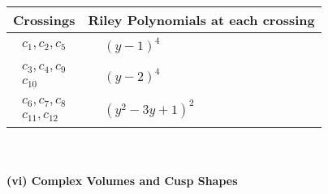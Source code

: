 \documentclass[1p]{elsarticle_modified}
\theoremstyle{definition}
\begin{document}
\begin{tabular}{m{50pt}|m{274pt}}
Crossings & \hspace{64pt}Riley Polynomials at each crossing \\
\hline $$\begin{aligned}c_{1},c_{2},c_{5}\end{aligned}$$&$\begin{aligned}
&(y-1)^4
\end{aligned}$\\
\hline $$\begin{aligned}c_{3},c_{4},c_{9}\\c_{10}\end{aligned}$$&$\begin{aligned}
&(y-2)^4
\end{aligned}$\\
\hline $$\begin{aligned}c_{6},c_{7},c_{8}\\c_{11},c_{12}\end{aligned}$$&$\begin{aligned}
&(y^2-3 y+1)^2
\end{aligned}$\\
\hline
\end{tabular}\\~\\
\newpage\flushleft \textbf{(vi) Complex Volumes and Cusp Shapes}
\end{document}
